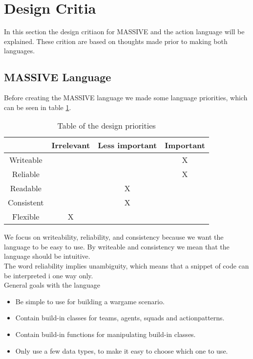 \section{Design Critia}
\label{sec:designcrit}
In this section the design critiaon for MASSIVE and the action language will be explained. These crition are based on thoughts made prior to making both languages.

\subsection{MASSIVE Language}
Before creating the MASSIVE language we made some language priorities, which can be seen in table \ref{table:priorities}.

\begin{table}[ht]
\caption{Table of the design priorities} %
\centering %
\begin{tabular}{cccc} %
\hline\hline %
 & Irrelevant & Less important & Important \\ [0.5ex] %
\hline %
Writeable &  &  & X\\ %
Reliable &  &  & X\\
Readable &  & X & \\
Consistent &  & X & \\
Flexible & X &  & \\ [1ex] %
\hline %
\end{tabular} 
\label{table:priorities} %
\end{table}

We focus on writeability, reliability, and consistency because we want the language to be easy to use. By writeable and consistency we mean that the language should be intuitive.\\
The word reliability implies unambiguity, which means that a snippet of code can be interpreted i one way only.\\ \indent
General goals with the language

\begin{itemize}
	\item Be simple to use for building a wargame scenario.
	\item Contain build-in classes for teams, agents, squads and actionpatterns.
	\item Contain build-in functions for manipulating build-in classes.
	\item Only use a few data types, to make it easy to choose which one to use.
\end{itemize}

